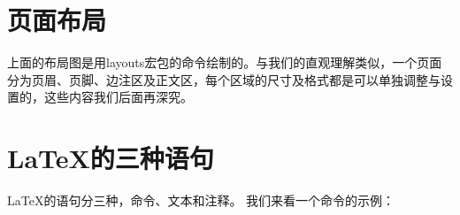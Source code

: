 \clearpage

\section{页面布局}
\drawpage
上面的布局图是用layouts宏包的\texinline{\drawpage}命令绘制的。与我们的直观理解类似，一个页面分为页眉、页脚、边注区及正文区，每个区域的尺寸及格式都是可以单独调整与设置的，这些内容我们后面再深究。

\section{\LaTeX 的三种语句} \label{sec:text type}
\LaTeX 的语句分三种，命令、文本和注释。
我们来看一个命令的示例：
\begin{texlst}
\end{texlst}

